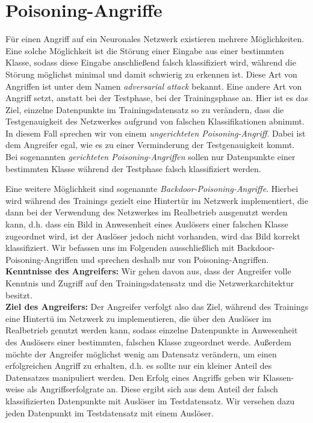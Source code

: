 \documentclass[11pt,a4paper]{article}
\def\emph#1{\textit{#1}}
\numberwithin{equation}{section}
\begin{document}
	
	\section{Poisoning-Angriffe} \label{chapter_poisoningattacks}
	Für einen Angriff auf ein Neuronales Netzwerk existieren mehrere Möglichkeiten. Eine solche Möglichkeit ist die Störung einer Eingabe aus einer bestimmten Klasse, sodass diese Eingabe anschließend falsch klassifiziert wird, während die Störung möglichst minimal und damit schwierig zu erkennen ist.
	Diese Art von Angriffen ist unter dem Namen \emph{adversarial attack} bekannt.
	Eine andere Art von Angriff setzt, anstatt bei der Testphase, bei der Trainingsphase an. Hier ist es das Ziel, einzelne Datenpunkte im Trainingsdatensatz so zu verändern, dass die Testgenauigkeit des Netzwerkes aufgrund von falschen Klassifikationen abnimmt. In diesem Fall sprechen wir von einem \emph{ungerichteten Poisoning-Angriff}. Dabei ist dem Angreifer egal, wie es zu einer Verminderung der Testgenauigkeit kommt. Bei sogenannten \emph{gerichteten Poisoning-Angriffen} sollen nur Datenpunkte einer bestimmten Klasse während der Testphase falsch klassifiziert werden.
	
	Eine weitere Möglichkeit sind sogenannte \emph{Backdoor-Poisoning-Angriffe}. Hierbei wird während des Trainings gezielt eine Hintertür im Netzwerk implementiert, die dann bei der Verwendung des Netzwerkes im Realbetrieb ausgenutzt werden kann, d.h. dass ein Bild in Anwesenheit eines Auslösers einer falschen Klasse zugeordnet wird, ist der Auslöser jedoch nicht vorhanden, wird das Bild korrekt klassifiziert. Wir befassen uns im Folgenden ausschließlich mit Backdoor-Poisoning-Angriffen und sprechen deshalb nur von Poisoning-Angriffen.\\
	
	\noindent \textbf{Kenntnisse des Angreifers:}
	Wir gehen davon aus, dass der Angreifer volle Kenntnis und Zugriff auf den Trainingsdatensatz und die Netzwerkarchitektur besitzt.\\
	
	\noindent \textbf{Ziel des Angreifers:}
	Der Angreifer verfolgt also das Ziel, während des Trainings eine Hintertü im Netzwerk zu implementieren, die über den Auslöser im Realbetrieb genutzt werden kann, sodass einzelne Datenpunkte in Anwesenheit des Auslösers einer bestimmten, falschen Klasse zugeordnet werde. Außerdem möchte der Angreifer möglichst wenig am Datensatz verändern, um einen erfolgreichen Angriff zu erhalten, d.h. es sollte nur ein kleiner Anteil des Datensatzes manipuliert werden.
	Den Erfolg eines Angriffs geben wir Klassen-weise als Angriffserfolgrate an. Diese ergibt sich aus dem Anteil der falsch klassifizierten Datenpunkte mit Auslöser im Testdatensatz. Wir versehen dazu jeden Datenpunkt im Testdatensatz mit einem Auslöser.
	
\end{document}
